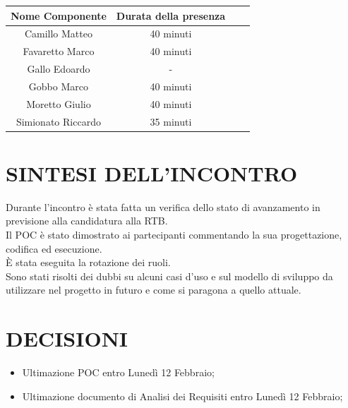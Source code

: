\documentclass[5pt]{article}
\begin{document}
	\begin{table}[ht]
		\begin{tabular}{|Sc|Sc|}
			\hline
			\textbf{Nome Componente} & \textbf{Durata della presenza} \\
			\hline
			Camillo Matteo & 40 minuti \\
			Favaretto Marco & 40 minuti \\
			Gallo Edoardo & - \\
			Gobbo Marco & 40 minuti \\
			Moretto Giulio & 40 minuti \\
			Simionato Riccardo & 35 minuti \\
			\hline
		\end{tabular}
		\label{tab:conference}
	\end{table}
	
	\section{SINTESI DELL'INCONTRO}
	Durante l'incontro è stata fatta un verifica dello stato di avanzamento in previsione alla candidatura alla RTB.\\
	Il POC è stato dimostrato ai partecipanti commentando la sua progettazione, codifica ed esecuzione.\\
	È stata eseguita la rotazione dei ruoli.\\
	Sono stati risolti dei dubbi su alcuni casi d'uso e sul modello di sviluppo da utilizzare nel progetto in futuro e come si paragona a quello attuale.
	
	\section{DECISIONI}
	\begin{itemize}
		\item Ultimazione POC entro Lunedì 12 Febbraio;
		\item Ultimazione documento di Analisi dei Requisiti entro Lunedì 12 Febbraio;
	\end{itemize}
	
	
\end{document}
